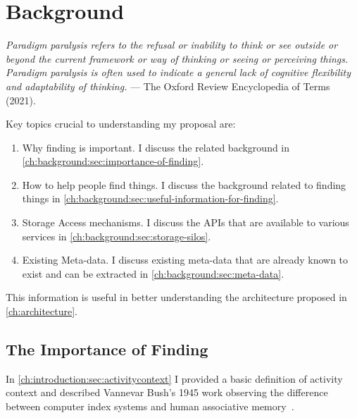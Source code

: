 \chapter{Background}
\label{ch:background}

\begin{epigraph}
    \textit{Paradigm paralysis refers to the refusal or inability to think or see
        outside or beyond the current framework or way of thinking or seeing or
        perceiving things.  Paradigm paralysis is often used to indicate a general
        lack of cognitive flexibility and adaptability of thinking.} --- The Oxford
    Review Encyclopedia of Terms (2021).
\end{epigraph}


Key topics crucial to understanding my proposal are:

\begin{enumerate}
    \item Why finding is important. I discuss the related background in
          \autoref{ch:background:sec:importance-of-finding}.

    \item How to help people find things.  I discuss the background related to
          finding things in \autoref{ch:background:sec:useful-information-for-finding}.

    \item Storage Access mechanisms.  I discuss the APIs that are available to
          various services in \autoref{ch:background:sec:storage-silos}.

    \item Existing Meta-data.  I discuss existing meta-data that are already
          known to exist and can be extracted in \autoref{ch:background:sec:meta-data}.

\end{enumerate}

This information is useful in better understanding the architecture proposed in
\autoref{ch:architecture}.

\section{The Importance of Finding}
\label{ch:background:sec:importance-of-finding}

In \autoref{ch:introduction:sec:activitycontext} I provided a basic definition
of activity context and described Vannevar Bush's 1945 work observing the
difference between computer index systems and human associative
memory~\cite{bush1945we}.


